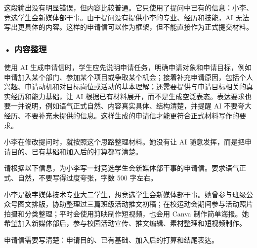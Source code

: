 这段输出没有明显错误，但内容比较普通。它只使用了提问中已有的信息：小李、竞选学生会新媒体部干事。由于提问没有提供小李的专业、经历和技能，AI 无法写出更具体的内容。这样的申请信可以作为框架，但不能直接作为正式提交材料。

\subsubsection*{\textbf{• 内容整理}}

使用 AI 生成申请信时，学生应先说明申请任务，明确申请对象和申请目标，例如申请加入某个部门、参加某个项目或争取某个机会；接着补充申请原因，包括个人兴趣、申请动机和对目标岗位或活动的基本理解；还需要提供与申请目标相关的真实经历和能力基础，让 AI 根据已有材料展开，而不是生成空泛表态。表达要求也要一并说明，例如语气正式自然、内容真实具体、结构清楚，并提醒 AI 不要夸大经历、不要补充未提供的信息。这样生成的申请信才能更符合正式材料写作的要求。

小李在修改提问时，就按照这个思路整理材料。她没有让 AI 随意发挥，而是把申请目的、已有基础和加入后的打算都写清楚。

\begin{userbox}
请根据以下信息，为小李写一封竞选学生会新媒体部干事的申请信。要求语气正式、自然，不要写得过度夸张，字数 500 字左右。

小李是数字媒体技术专业大二学生，想竞选学生会新媒体部干事。她曾参与班级公众号图文排版，协助整理过三篇班级活动推文初稿；在校运动会期间参与活动照片拍摄和分类整理；平时会使用剪映制作短视频，也会用 Canva 制作简单海报。她希望加入新媒体部后，参与校园活动宣传、推文编辑、素材整理和短视频制作。

申请信需要写清楚：申请目的、已有基础、加入后的打算和结尾表达。
\end{userbox}


